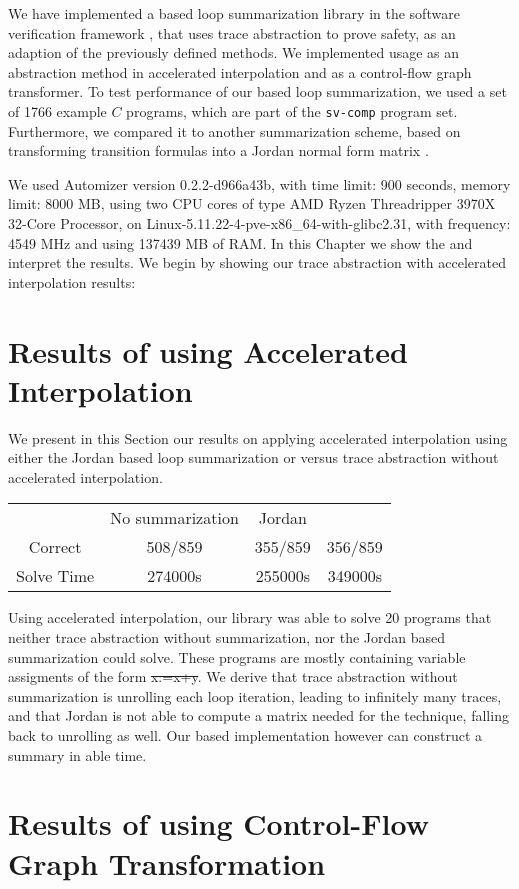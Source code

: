 
We have implemented a \qvasr based loop summarization library in the software verification framework \ultimate, that uses trace abstraction to prove safety, as an adaption of the previously defined methods. We implemented \qvasr usage as an abstraction method in  accelerated interpolation and as a control-flow graph transformer. To test performance of our \qvasr based loop summarization, we used a set of 1766 example $C$ programs, which are part of the \texttt{sv-comp} \cite{svcomp} program set. Furthermore, we compared it to another summarization scheme, based on transforming transition formulas into a Jordan normal form matrix \cite{DBLP:conf/popl/JeannetSS14}. \par
We used \ultimate Automizer version 0.2.2-d966a43b, with time limit: 900 seconds, memory limit: 8000 MB, using two CPU cores of type AMD Ryzen Threadripper 3970X 32-Core Processor, on Linux-5.11.22-4-pve-x86\_64-with-glibc2.31, with frequency: 4549 MHz and using 137439 MB of RAM. In this Chapter we show the and interpret the results. We begin by showing our trace abstraction with accelerated interpolation results:

\section{Results of using Accelerated Interpolation}
We present in this Section our results on applying accelerated interpolation using either the Jordan based loop summarization or \qvasr versus trace abstraction without accelerated interpolation.
\begin{table}[H]
		\begin{tabular}{cccc}
			\toprule
			& No summarization & Jordan & \qvasr \\
			\cmidrule{1-4}
			Correct & 508/859 & 355/859 & 356/859\\
			Solve Time &  274000s & 255000s & 349000s\\
		\end{tabular}
\end{table}
Using accelerated interpolation, our \qvasr library was able to solve 20 programs that neither trace abstraction without summarization, nor the Jordan based summarization could solve. These programs are mostly containing variable assigments of the form \st{x:=x+y}. We derive that trace abstraction without summarization is unrolling each loop iteration, leading to infinitely many traces, and that Jordan is not able to compute a matrix needed for the technique, falling back to unrolling as well. Our \qvasr based implementation however can construct a summary in able time.

\section{Results of using Control-Flow Graph Transformation}